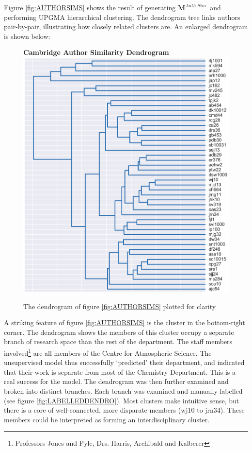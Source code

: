 Figure \ref{fig:AUTHORSIMS} shows the result of generating $\textbf{M}^{Auth. Sim.}$ and performing UPGMA hierarchical clustering. The dendrogram tree links authors pair-by-pair, illustrating how closely related clusters are. An enlarged dendrogram is shown below:
\begin{center}
\begin{figure}[H]
  \centering
  \textbf{Cambridge Author Similarity Dendrogram}
    \includegraphics[width=\textwidth]{Analysis/dendro.png}
    \caption[Cambridge Author Similarity Dendrogram]{The dendrogram of figure \ref{fig:AUTHORSIMS} plotted for clarity}
\end{figure} 
\label{fig:DENDRO}
\end{center}
A striking feature of figure \ref{fig:AUTHORSIMS} is the cluster in the bottom-right corner. The dendrogram shows the members of this cluster occupy a separate branch of research space than the rest of the department. The staff members involved\footnote{Professors Jones and Pyle, Drs. Harris, Archibald and Kalberer} are all members of the Centre for Atmospheric Science. The unsupervised model thus successfully `predicted' their department, and indicated that their work is separate from most of the Chemistry Department. This is a real success for the model. The dendrogram was then further examined and broken into distinct branches. Each branch was examined and manually labelled (see figure \ref{fig:LABELLEDDENDRO}). Most clusters make intuitive sense, but there is a core of well-connected, more disparate members (wj10 to jrn34). These members could be interpreted as forming an interdisciplinary cluster.  
